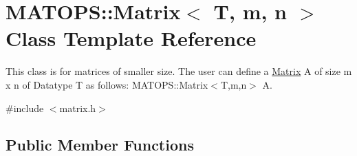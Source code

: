 \hypertarget{classMATOPS_1_1Matrix}{}\section{M\+A\+T\+O\+PS\+:\+:Matrix$<$ T, m, n $>$ Class Template Reference}
\label{classMATOPS_1_1Matrix}


This class is for matrices of smaller size. The user can define a \hyperlink{classMATOPS_1_1Matrix}{Matrix} A of size m x n of Datatype T as follows\+: M\+A\+T\+O\+P\+S\+::\+Matrix$<$\+T,m,n$>$ A.  




{\ttfamily \#include $<$matrix.\+h$>$}

\subsection*{Public Member Functions}
